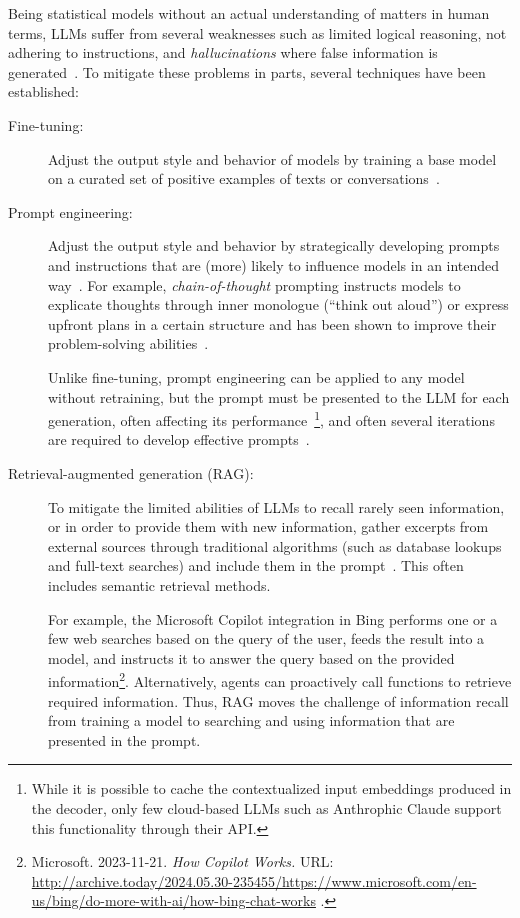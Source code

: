 Being statistical models without an actual understanding of matters in human terms, LLMs suffer from several weaknesses such as limited logical reasoning, not adhering to instructions, and \emph{hallucinations} where false information is generated~\cite{openai2024gpt4}.
To mitigate these problems in parts, several techniques have been established:
%
\begin{description}
	\item[Fine-tuning:] Adjust the output style and behavior of models by training a base model on a curated set of positive examples of texts or conversations~\cite{kojima2022large,wei2022finetuned}.

	\item[Prompt engineering:] Adjust the output style and behavior by strategically developing prompts and instructions that are (more) likely to influence models in an intended way~\cite{white2023prompt}.
	For example, \emph{chain-of-thought} prompting instructs models to explicate thoughts through inner monologue (``think out aloud'') or express upfront plans in a certain structure and has been shown to improve their problem-solving abilities~\cite{wei2023chainofthought}.

	Unlike fine-tuning, prompt engineering can be applied to any model without retraining, but the prompt must be presented to the LLM for each generation, often affecting its performance~\cite{zhao2023survey}\footnote{While it is possible to cache the contextualized input embeddings produced in the decoder, only few cloud-based LLMs such as Anthrophic Claude support this functionality through their API.}, and often several iterations are required to develop effective prompts~\cite{white2023prompt}.

	\item[Retrieval-augmented generation (RAG):] To mitigate the limited abilities of LLMs to recall rarely seen information, or in order to provide them with new information, gather excerpts from external sources through traditional algorithms (such as database lookups and full-text searches) and include them in the prompt~\cite{lewis2020retrieval}.
	This often includes semantic retrieval methods.

	For example, the Microsoft Copilot integration in Bing performs one or a few web searches based on the query of the user, feeds the result into a \gptfouro model, and instructs it to answer the query based on the provided information\footnote{
		Microsoft. 2023-11-21. \emph{How Copilot Works.}
		URL:
		\url{http://archive.today/2024.05.30-235455/https://www.microsoft.com/en-us/bing/do-more-with-ai/how-bing-chat-works}%
		.
	}.
	Alternatively, agents can proactively call functions to retrieve required information.
	Thus, RAG moves the challenge of information recall from training a model to searching and using information that are presented in the prompt.
\end{description}

